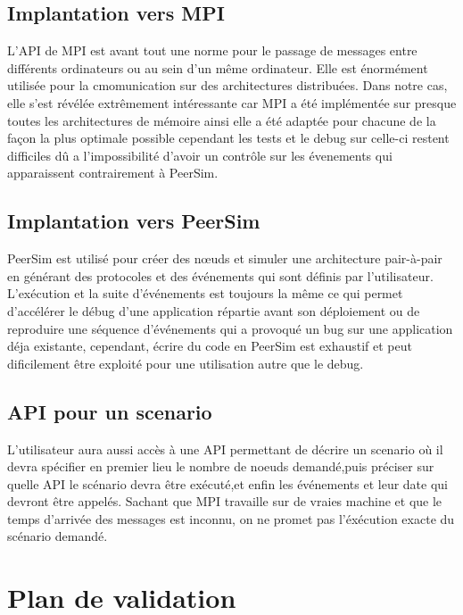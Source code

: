 \documentclass{article}
\begin{document}
			\subsection{Implantation vers MPI}
			L'API de MPI est avant tout une norme pour le passage de messages entre différents ordinateurs ou au sein d'un même ordinateur.
			Elle est énormément utilisée pour la cmomunication sur des architectures distribuées.
			Dans notre cas, elle s'est révélée extrêmement intéressante car MPI a été implémentée sur presque toutes les architectures de mémoire ainsi elle 
			a été adaptée pour chacune de la façon la plus optimale possible cependant les tests et le debug sur celle-ci restent difficiles dû a l'impossibilité 
			d'avoir un contrôle sur les évenements qui apparaissent contrairement à PeerSim.
			\subsection{Implantation vers PeerSim}
			PeerSim est utilisé pour créer des nœuds et simuler une architecture pair-à-pair en générant des protocoles et des événements qui sont définis par l'utilisateur. L'exécution et la suite d'événements est toujours la même ce qui permet d'accélérer 
			le débug d'une application répartie avant son déploiement ou de reproduire une séquence d'événements qui a provoqué un bug
			sur une application déja existante, cependant, écrire du code en PeerSim est exhaustif et peut dificilement être exploité pour une utilisation
			autre que le debug.
			\subsection{API pour un scenario}
			L'utilisateur aura aussi accès à une API permettant de décrire un scenario où il devra spécifier en premier lieu
			le nombre de noeuds demandé,puis préciser sur quelle API le scénario devra être exécuté,et enfin les événements et leur date qui devront être appelés.
			Sachant que MPI travaille sur de vraies machine et que le temps d'arrivée des messages est inconnu, on ne promet pas l'éxécution exacte du scénario demandé. 

		\section{Plan de validation}
\end{document}
